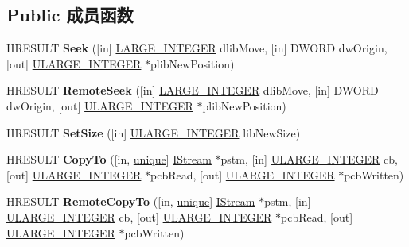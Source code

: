 \subsection*{Public 成员函数}
\begin{DoxyCompactItemize}
\item 
\mbox{\label{interface_i_stream_aa8c75b3b4f70e3cf241e43e2a1aa2b10}} 
H\+R\+E\+S\+U\+LT {\bfseries Seek} (\mbox{[}in\mbox{]} \hyperlink{union___l_a_r_g_e___i_n_t_e_g_e_r}{L\+A\+R\+G\+E\+\_\+\+I\+N\+T\+E\+G\+ER} dlib\+Move, \mbox{[}in\mbox{]} D\+W\+O\+RD dw\+Origin, \mbox{[}out\mbox{]} \hyperlink{struct___u_l_a_r_g_e___i_n_t_e_g_e_r}{U\+L\+A\+R\+G\+E\+\_\+\+I\+N\+T\+E\+G\+ER} $\ast$plib\+New\+Position)
\item 
\mbox{\label{interface_i_stream_acec7c7b63320bfe1d506aff096bdd1b7}} 
H\+R\+E\+S\+U\+LT {\bfseries Remote\+Seek} (\mbox{[}in\mbox{]} \hyperlink{union___l_a_r_g_e___i_n_t_e_g_e_r}{L\+A\+R\+G\+E\+\_\+\+I\+N\+T\+E\+G\+ER} dlib\+Move, \mbox{[}in\mbox{]} D\+W\+O\+RD dw\+Origin, \mbox{[}out\mbox{]} \hyperlink{struct___u_l_a_r_g_e___i_n_t_e_g_e_r}{U\+L\+A\+R\+G\+E\+\_\+\+I\+N\+T\+E\+G\+ER} $\ast$plib\+New\+Position)
\item 
\mbox{\label{interface_i_stream_a34414bf422a0a5cd41d420fe1bad9c37}} 
H\+R\+E\+S\+U\+LT {\bfseries Set\+Size} (\mbox{[}in\mbox{]} \hyperlink{struct___u_l_a_r_g_e___i_n_t_e_g_e_r}{U\+L\+A\+R\+G\+E\+\_\+\+I\+N\+T\+E\+G\+ER} lib\+New\+Size)
\item 
\mbox{\label{interface_i_stream_a0f824386aef7571c36b818fee9d003bb}} 
H\+R\+E\+S\+U\+LT {\bfseries Copy\+To} (\mbox{[}in, \hyperlink{interfaceunique}{unique}\mbox{]} \hyperlink{interface_i_stream}{I\+Stream} $\ast$pstm, \mbox{[}in\mbox{]} \hyperlink{struct___u_l_a_r_g_e___i_n_t_e_g_e_r}{U\+L\+A\+R\+G\+E\+\_\+\+I\+N\+T\+E\+G\+ER} cb, \mbox{[}out\mbox{]} \hyperlink{struct___u_l_a_r_g_e___i_n_t_e_g_e_r}{U\+L\+A\+R\+G\+E\+\_\+\+I\+N\+T\+E\+G\+ER} $\ast$pcb\+Read, \mbox{[}out\mbox{]} \hyperlink{struct___u_l_a_r_g_e___i_n_t_e_g_e_r}{U\+L\+A\+R\+G\+E\+\_\+\+I\+N\+T\+E\+G\+ER} $\ast$pcb\+Written)
\item 
\mbox{\label{interface_i_stream_ae3c34181b0a9eb64a158fda411b83233}} 
H\+R\+E\+S\+U\+LT {\bfseries Remote\+Copy\+To} (\mbox{[}in, \hyperlink{interfaceunique}{unique}\mbox{]} \hyperlink{interface_i_stream}{I\+Stream} $\ast$pstm, \mbox{[}in\mbox{]} \hyperlink{struct___u_l_a_r_g_e___i_n_t_e_g_e_r}{U\+L\+A\+R\+G\+E\+\_\+\+I\+N\+T\+E\+G\+ER} cb, \mbox{[}out\mbox{]} \hyperlink{struct___u_l_a_r_g_e___i_n_t_e_g_e_r}{U\+L\+A\+R\+G\+E\+\_\+\+I\+N\+T\+E\+G\+ER} $\ast$pcb\+Read, \mbox{[}out\mbox{]} \hyperlink{struct___u_l_a_r_g_e___i_n_t_e_g_e_r}{U\+L\+A\+R\+G\+E\+\_\+\+I\+N\+T\+E\+G\+ER} $\ast$pcb\+Written)

\end{DoxyCompactItemize}
